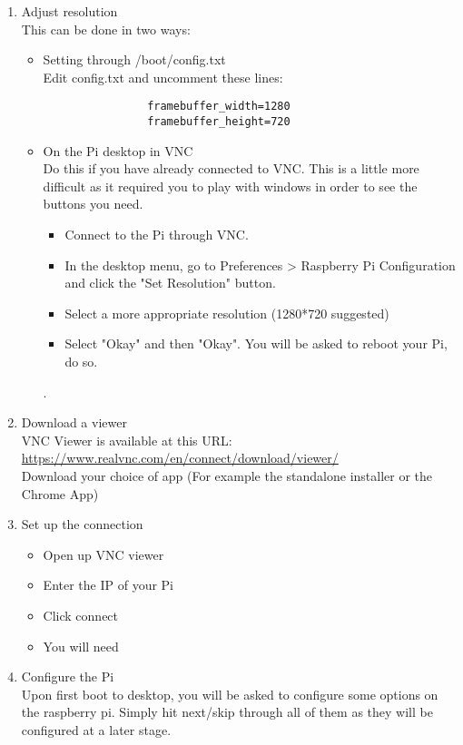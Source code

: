 \begin{enumerate}
    
    \item Adjust resolution\\
    This can be done in two ways:
    \begin{itemize}
        \item Setting through /boot/config.txt\\
            Edit config.txt and uncomment these lines:
            \begin{verbatim}
                framebuffer_width=1280
                framebuffer_height=720
            \end{verbatim}
        \item On the Pi desktop in VNC\\
            Do this if you have already connected to VNC. This is a little more difficult as it required you to play with windows in order to see the buttons you need.
            \begin{itemize}
                \item Connect to the Pi through VNC. 
                \item In the desktop menu, go to Preferences > Raspberry Pi Configuration and click the "Set Resolution" button. 
                \item Select a more appropriate resolution (1280*720 suggested)
                \item Select "Okay" and then "Okay". You will be asked to reboot your Pi, do so.
            \end{itemize}
            .
    \end{itemize}
    \item Download a viewer\\
    VNC Viewer is available at this URL:\\ \href{https://www.realvnc.com/en/connect/download/viewer/}{https://www.realvnc.com/en/connect/download/viewer/}\\ 
    Download your choice of app (For example the standalone installer or the Chrome App)
    \item Set up the connection
        \begin{itemize}
            \item Open up VNC viewer
            \item Enter the IP of your Pi
            \item Click connect
            \item You will need 
        \end{itemize}
    \item Configure the Pi\\
    Upon first boot to desktop, you will be asked to configure some options on the raspberry pi. Simply hit next/skip through all of them as they will be configured at a later stage.
\end{enumerate}

